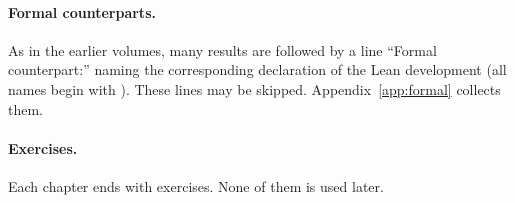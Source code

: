 \paragraph{Formal counterparts.} As in the earlier volumes, many results are followed by a line
``Formal counterpart:'' naming the corresponding declaration of the Lean development (all names
begin with ). These lines may be skipped. Appendix~\ref{app:formal} collects them.

\paragraph{Exercises.} Each chapter ends with exercises. None of them is used later.
